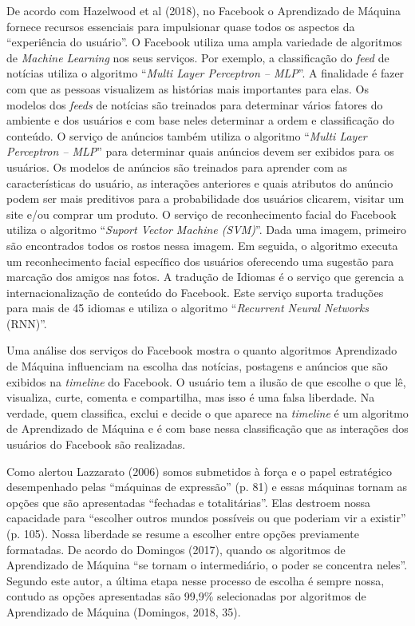De acordo com Hazelwood et al (2018), no Facebook o Aprendizado de
Máquina fornece recursos essenciais para impulsionar quase todos os
aspectos da ``experiência do usuário''. O Facebook utiliza uma ampla
variedade de algoritmos de \emph{Machine Learning} nos seus serviços.
Por exemplo, a classificação do \emph{feed} de notícias utiliza o
algoritmo ``\emph{Multi Layer Perceptron -- MLP}''. A finalidade é fazer
com que as pessoas visualizem as histórias mais importantes para elas.
Os modelos dos \emph{feeds} de notícias são treinados para determinar
vários fatores do ambiente e dos usuários e com base neles determinar a
ordem e classificação do conteúdo. O serviço de anúncios também utiliza
o algoritmo ``\emph{Multi Layer Perceptron -- MLP}'' para determinar
quais anúncios devem ser exibidos para os usuários. Os modelos de
anúncios são treinados para aprender com as características do usuário,
as interações anteriores e quais atributos do anúncio podem ser mais
preditivos para a probabilidade dos usuários clicarem, visitar um site
e/ou comprar um produto. O serviço de reconhecimento facial do Facebook
utiliza o algoritmo ``\emph{Suport Vector Machine (SVM)}''. Dada uma
imagem, primeiro são encontrados todos os rostos nessa imagem. Em
seguida, o algoritmo executa um reconhecimento facial específico dos
usuários oferecendo uma sugestão para marcação dos amigos nas fotos. A
tradução de Idiomas é o serviço que gerencia a internacionalização de
conteúdo do Facebook. Este serviço suporta traduções para mais de 45
idiomas e utiliza o algoritmo ``\emph{Recurrent Neural Networks}
(RNN)''.

Uma análise dos serviços do Facebook mostra o quanto algoritmos
Aprendizado de Máquina influenciam na escolha das notícias, postagens e
anúncios que são exibidos na \emph{timeline} do Facebook. O usuário tem
a ilusão de que escolhe o que lê, visualiza, curte, comenta e
compartilha, mas isso é uma falsa liberdade. Na verdade, quem
classifica, exclui e decide o que aparece na \emph{timeline} é um
algoritmo de Aprendizado de Máquina e é com base nessa classificação que
as interações dos usuários do Facebook são realizadas.

Como alertou Lazzarato (2006) somos submetidos à força e o papel
estratégico desempenhado pelas ``máquinas de expressão'' (p. 81) e essas
máquinas tornam as opções que são apresentadas ``fechadas e
totalitárias''. Elas destroem nossa capacidade para ``escolher outros
mundos possíveis ou que poderiam vir a existir'' (p. 105). Nossa
liberdade se resume a escolher entre opções previamente formatadas. De
acordo do Domingos (2017), quando os algoritmos de Aprendizado de
Máquina ``se tornam o intermediário, o poder se concentra neles''.
Segundo este autor, a última etapa nesse processo de escolha é sempre
nossa, contudo as opções apresentadas são 99,9\% selecionadas por
algoritmos de Aprendizado de Máquina (Domingos, 2018, 35).

